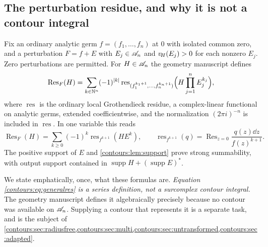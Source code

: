 \documentclass[11pt,letterpaper]{article}
\theoremstyle{definition}
\theoremstyle{remark}
\newcommand{\N}{\mathbb N}\newcommand{\Z}{\mathbb Z}\newcommand{\DD}{\mathbb D}
\newcommand{\supp}{\operatorname{supp}}\newcommand{\Res}{\operatorname{Res}}
\newcommand{\res}{\operatorname{res}}\newcommand{\wind}{\operatorname{wind}}
\numberwithin{equation}{section}
\begin{document}
\subsection{The perturbation residue, and why it is not a contour integral}
\label{contours:subsec:residuedef}
Fix an ordinary analytic germ $f=(f_1,\ldots,f_n)$ at $0$ with isolated common
zero, and a perturbation $F=f+E$ with $E_j\in\mathscr A_n$ and $v_{\!H}(E_j)>0$ for each
nonzero $E_j$. Zero perturbations are permitted. For $H\in\mathscr A_n$ the geometry
manuscript defines
\begin{equation}\label{contours:eq:generalres}
  \Res_F(H)=\sum_{k\in\N^n}(-1)^{|k|}
  \res_{(f_1^{k_1+1},\ldots,f_n^{k_n+1})}
  \Bigl(H\prod_{j=1}^nE_j^{k_j}\Bigr),
\end{equation}
where $\res$ is the ordinary local Grothendieck residue, a complex-linear
functional on analytic germs, extended coefficientwise, and the normalization
$(2\pi i)^{-n}$ is included in $\res$. In one variable this reads
\begin{equation}\label{contours:eq:residueone}
  \Res_F(H)=\sum_{k\ge0}(-1)^k\res_{f^{k+1}}(HE^k),
  \qquad
  \res_{f^{k+1}}(q)=\Res_{z=0}\frac{q(z)\dd z}{f(z)^{k+1}} .
\end{equation}
The positive support of $E$ and \cref{contours:lem:support} prove strong
summability, with output support contained in $\supp H+(\supp E)^*$.

We state emphatically, once, what these formulas are. \emph{Equation
\eqref{contours:eq:generalres} is a series definition, not a surcomplex contour
integral.} The geometry manuscript defines it algebraically precisely because no
contour was available on $\mathscr A_n$. Supplying a contour that represents it is a
separate task, and is the subject of
\cref{contours:sec:radiusfree,contours:sec:multi,contours:sec:untransformed,contours:sec:adapted}.
\end{document}
